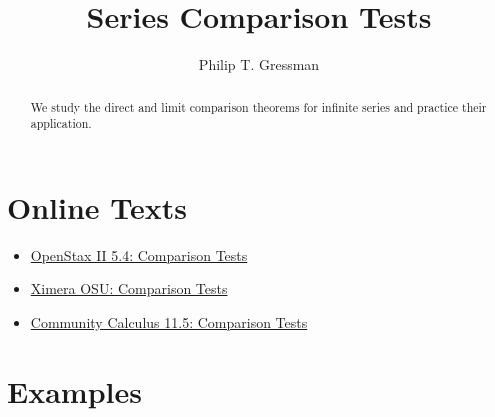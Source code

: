 \documentclass{ximera}
\title{Series Comparison Tests}
\author{Philip T. Gressman}
\begin{document}
\begin{abstract}
We study the direct and limit comparison theorems for infinite series and practice their application.
\end{abstract}
\maketitle

\section*{Online Texts}
\begin{itemize}
\item \href{https://openstax.org/books/calculus-volume-2/pages/5-4-comparison-tests}{OpenStax II 5.4: Comparison Tests}
\item \href{https://ximera.osu.edu/mooculus/calculus2/comparisonTests/titlePage}{Ximera OSU: Comparison Tests}
\item \href{https://www.whitman.edu/mathematics/calculus_online/section11.05.html}{Community Calculus 11.5: Comparison Tests}
\end{itemize}

\section*{Examples}

\begin{example}

\end{example}

\begin{example}

\end{example}
\end{document}
